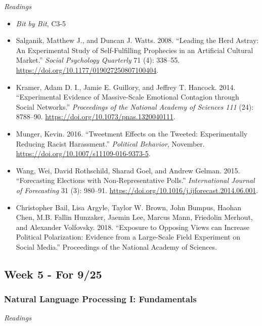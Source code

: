 \documentclass[
  10pt,
]{article}
\providecommand{\tightlist}{%
  \setlength{\itemsep}{0pt}\setlength{\parskip}{0pt}}
\begin{document}
\emph{Readings}

\begin{itemize}
\tightlist
\item
  \emph{Bit by Bit}, C3-5
\item
  Salganik, Matthew J., and Duncan J. Watts. 2008. ``Leading the Herd
  Astray: An Experimental Study of Self-Fulfilling Prophecies in an
  Artificial Cultural Market.'' \emph{Social Psychology Quarterly} 71
  (4): 338--55. \url{https://doi.org/10.1177/019027250807100404}.
\item
  Kramer, Adam D. I., Jamie E. Guillory, and Jeffrey T. Hancock. 2014.
  ``Experimental Evidence of Massive-Scale Emotional Contagion through
  Social Networks.'' \emph{Proceedings of the National Academy of
  Sciences 111} (24): 8788--90.
  \url{https://doi.org/10.1073/pnas.1320040111}.
\item
  Munger, Kevin. 2016. ``Tweetment Effects on the Tweeted:
  Experimentally Reducing Racist Harassment.'' \emph{Political
  Behavior}, November. \url{https://doi.org/10.1007/s11109-016-9373-5}.
\item
  Wang, Wei, David Rothschild, Sharad Goel, and Andrew Gelman. 2015.
  ``Forecasting Elections with Non-Representative Polls.''
  \emph{International Journal of Forecasting} 31 (3): 980--91.
  \url{https://doi.org/10.1016/j.ijforecast.2014.06.001}.
\item
  Christopher Bail, Lisa Argyle, Taylor W. Brown, John Bumpus, Haohan
  Chen, M.B. Fallin Hunzaker, Jaemin Lee, Marcus Mann, Friedolin
  Merhout, and Alexander Volfovsky. 2018. ``Exposure to Opposing Views
  can Increase Political Polarization: Evidence from a Large-Scale Field
  Experiment on Social Media.'' Proceedings of the National Academy of
  Sciences.
\end{itemize}

\hypertarget{week-5---for-925}{%
\subsection{Week 5 - For 9/25}\label{week-5---for-925}}

\hypertarget{natural-language-processing-i-fundamentals}{%
\subsubsection{Natural Language Processing I:
Fundamentals}\label{natural-language-processing-i-fundamentals}}

\emph{Readings}
\end{document}
